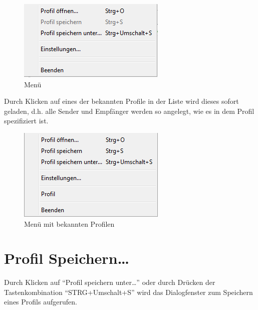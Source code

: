 \begin{figure}[htbp]
\begin{center}
\includegraphics{images/menu1.png}
\caption[Menü]{Menü}
\label{menu1}
\end{center}
\end{figure}

Durch Klicken auf eines der bekannten Profile in der Liste wird dieses sofort
geladen, d.h. alle Sender und Empfänger werden so angelegt, wie es in dem Profil
spezifiziert ist.

\begin{figure}[htbp]
\begin{center}
\includegraphics{images/menu2.png}
\caption[Menü mit bekannten Profilen]{Menü mit bekannten Profilen}
\label{menu2}
\end{center}
\end{figure}

\chapter{Profil Speichern\ldots}
Durch Klicken auf ``Profil speichern unter\ldots'' oder durch Drücken der
Tastenkombination ``STRG+Umschalt+S'' wird das Dialogfenster zum Speichern eines
Profils aufgerufen.

